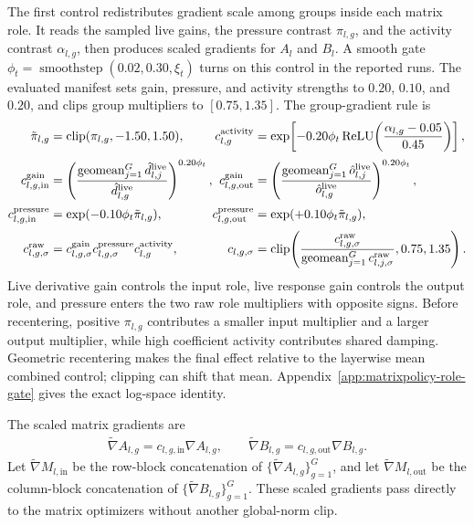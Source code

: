 \documentclass{article}
\newcommand{\clip}{\operatorname{clip}}
\newcommand{\geom}{\operatorname{geomean}}
\newcommand{\relu}{\operatorname{ReLU}}
\newcommand{\smooth}{\operatorname{smoothstep}}
\begin{document}
The first control redistributes gradient scale among groups inside each matrix
role.  It reads the sampled live gains, the pressure contrast $\pi_{l,g}$, and
the activity contrast $\alpha_{l,g}$, then produces scaled gradients for
$A_l$ and $B_l$.  A smooth gate
$\phi_t=\smooth(0.02,0.30,\xi_t)$ turns on this control in the reported runs.
The evaluated manifest sets gain, pressure, and activity strengths to $0.20$,
$0.10$, and $0.20$, and clips group multipliers to $[0.75,1.35]$.  The
group-gradient rule is
\begin{equation}
\begin{alignedat}{2}
    \tilde{\pi}_{l,g}
    &=
    \clip(\pi_{l,g},-1.50,1.50),
    \qquad&
    c^{\rm activity}_{l,g}
    &=
    \exp\!\left[
    -0.20\phi_t
    \relu\!\left(\frac{\alpha_{l,g}-0.05}{0.45}\right)
    \right],
    \\[2pt]
    c^{\rm gain}_{l,g,\mathrm{in}}
    &=
    \left(
    \frac{\geom_{j=1}^{G}\hat d^{\rm live}_{l,j}}
         {\hat d^{\rm live}_{l,g}}
    \right)^{0.20\phi_t},
    &
    c^{\rm gain}_{l,g,\mathrm{out}}
    &=
    \left(
    \frac{\geom_{j=1}^{G}\hat o^{\rm live}_{l,j}}
         {\hat o^{\rm live}_{l,g}}
    \right)^{0.20\phi_t},
    \\[2pt]
    c^{\rm pressure}_{l,g,\mathrm{in}}
    &=
    \exp(-0.10\phi_t\tilde{\pi}_{l,g}),
    &
    c^{\rm pressure}_{l,g,\mathrm{out}}
    &=
    \exp(+0.10\phi_t\tilde{\pi}_{l,g}),
    \\[2pt]
    c^{\rm raw}_{l,g,\sigma}
    &=
    c^{\rm gain}_{l,g,\sigma}
    c^{\rm pressure}_{l,g,\sigma}
    c^{\rm activity}_{l,g},
    &
    c_{l,g,\sigma}
    &=
    \clip\!\left(
    \frac{c^{\rm raw}_{l,g,\sigma}}
         {\geom_{j=1}^{G}c^{\rm raw}_{l,j,\sigma}},
    0.75,1.35
    \right).
\end{alignedat}
\label{eq:group-policy}
\end{equation}
Live derivative gain controls the input role, live response gain controls the
output role, and pressure enters the two raw role multipliers with opposite
signs.  Before recentering, positive $\pi_{l,g}$ contributes a smaller input
multiplier and a larger output multiplier, while high coefficient activity
contributes shared damping.  Geometric recentering makes the final effect
relative to the layerwise mean combined control; clipping can shift that mean.
Appendix~\ref{app:matrixpolicy-role-gate} gives the exact log-space identity.

The scaled matrix gradients are
\begin{align}
    \widetilde\nabla A_{l,g}=c_{l,g,\mathrm{in}}\nabla A_{l,g},
    \qquad
    \widetilde\nabla B_{l,g}=c_{l,g,\mathrm{out}}\nabla B_{l,g}.
    \label{eq:scaled-gradients}
\end{align}
Let $\widetilde\nabla M_{l,\mathrm{in}}$ be the row-block concatenation of
$\{\widetilde\nabla A_{l,g}\}_{g=1}^{G}$, and let
$\widetilde\nabla M_{l,\mathrm{out}}$ be the column-block concatenation of
$\{\widetilde\nabla B_{l,g}\}_{g=1}^{G}$.  These scaled gradients pass directly
to the matrix optimizers without another global-norm clip.
\end{document}
